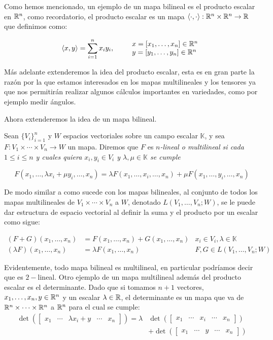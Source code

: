   Como hemos mencionado, un ejemplo de un mapa bilineal es el producto escalar en $\mathbb{R}^n$, como recordatorio, el producto escalar es un mapa $\langle \cdot , \cdot \rangle: \mathbb{R}^n \times \mathbb{R}^n \to \mathbb{R}$ que definimos como:

\[
  \langle x,y \rangle = \sum_{i=1}^{n} x_i y_i, \quad\quad
  \begin{array}{l}
  x=[x_1,\dots,x_n] \in \mathbb{R}^n\\
  y=[y_1,\dots,y_n] \in \mathbb{R}^n
  \end{array}
\] 

Más adelante extenderemos la idea del producto escalar, esta es en gran parte la razón por la que estamos interesados en los mapas multilineales y los tensores ya que nos permitirán realizar algunos cálculos importantes en variedades, como por ejemplo medir ángulos.

Ahora extenderemos la idea de un mapa bilineal.

\begin{definition}
  Sean $\{V_i\}_{i=1}^{n}$ y $W$ espacios vectoriales sobre un campo escalar $\mathbb{K}$, y  sea $F: V_1 \times \cdots \times V_n \to W$ un mapa. Diremos que $F$ es \it{$n$-lineal} o \it{multilineal} si cada $1 \leq i \leq n$ y cuales quiera $x_i,y_i \in V_i$ y $\lambda,\mu \in \mathbb{K}$ se cumple 

  \[ F(x_1, \dots, \lambda x_i + \mu y_i, \dots, x_n) = \lambda F(x_1, \dots, x_i, \dots, x_n) + \mu F(x_1, \dots, y_i, \dots, x_n) \]
\end{definition}

De modo similar a como sucede con los mapas bilineales, al conjunto de todos los mapas multilineales de $V_1 \times \cdots \times V_n$ a $W$, denotado $L(V_1, \ldots, V_n; W)$, se le puede dar estructura de espacio vectorial al definir la suma y el producto por un escalar como sigue:

\begin{align*}
  (F+G)(x_1,\ldots,x_n) &= F(x_1,\ldots,x_n) + G(x_1,\ldots,x_n) & x_i \in V_i, \lambda \in \mathbb{K}\\
  (\lambda F)(x_1,\ldots,x_n) &= \lambda F(x_1,\ldots,x_n) & F,G \in L(V_1,\ldots,V_n;W)
\end{align*}

  Evidentemente, todo mapa bilineal es multilineal, en particular podríamos decir que es $2-$lineal. Otro ejemplo de un mapa multilineal además del producto escalar es el determinante. Dado que si tomamos $n+1$ vectores, $x_1, \ldots, x_n, y \in \mathbb{R}^n$ y un escalar $\lambda \in \mathbb{R}$, el determinante es un mapa que va de $\mathbb{R}^n \times \cdots \times \mathbb{R}^n$ a $\mathbb{R}^n$ para el cual se cumple:
\begin{align*}
  \det(\begin{bmatrix}x_1 & \cdots & \lambda x_i + y & \cdots & x_n \end{bmatrix}) = \lambda &
  \det(\begin{bmatrix}x_1 & \cdots &x_i&\cdots& x_n \end{bmatrix})\\ 
    &+ \det(\begin{bmatrix}x_1 & \cdots & y & \cdots & x_n \end{bmatrix})
\end{align*}

